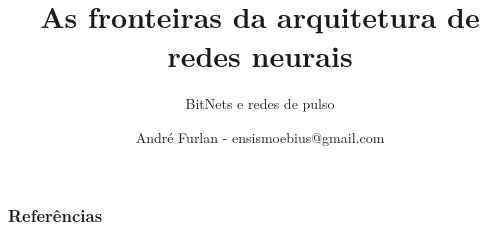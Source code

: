 %
\newif\ifincludebitnet
\includebitnettrue



\title{As fronteiras da arquitetura de redes neurais}
\subtitle{BitNets e redes de pulso}


\author{André Furlan - ensismoebius@gmail.com}

\date{\the\year}



	

	\begin{frame}[allowframebreaks]
		\frametitle{Referências}
		
	\end{frame}


